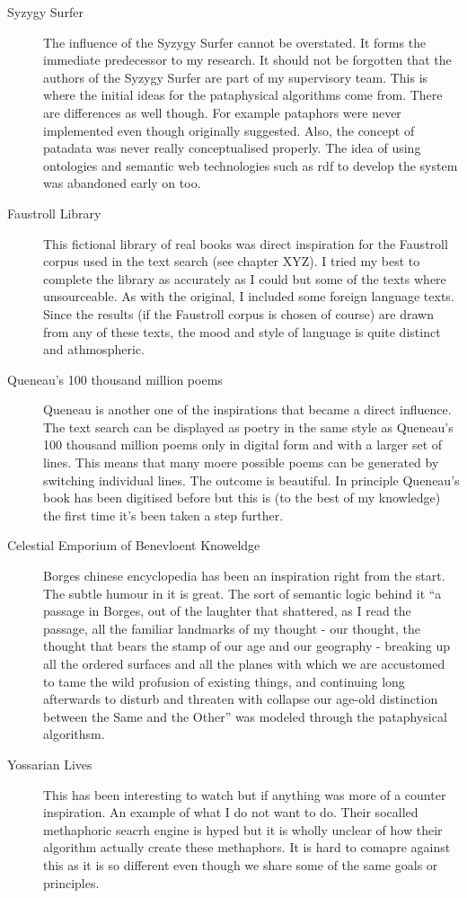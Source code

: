 \begin{description}
  \item[Syzygy Surfer] The influence of the Syzygy Surfer cannot be overstated. It forms the immediate predecessor to my research. It should not be forgotten that the authors of the Syzygy Surfer are part of my supervisory team. This is where the initial ideas for the pataphysical algorithms come from. There are differences as well though. For example pataphors were never implemented even though originally suggested. Also, the concept of patadata was never really conceptualised properly. The idea of using ontologies and semantic web technologies such as \gls{rdf} to develop the system was abandoned early on too.
  \item[Faustroll Library] This fictional library of real books was direct inspiration for the Faustroll corpus used in the text search (see chapter XYZ). I tried my best to complete the library as accurately as I could but some of the texts where unsourceable. As with the original, I included some foreign language texts. Since the results (if the Faustroll corpus is chosen of course) are drawn from any of these texts, the mood and style of language is quite distinct and athmospheric.
  \item[Queneau's 100 thousand million poems] Queneau is another one of the inspirations that became a direct influence. The text search can be displayed as poetry in the same style as Queneau's 100 thousand million poems only in digital form and with a larger set of lines. This means that many moere possible poems can be generated by switching individual lines. The outcome is beautiful. In principle Queneau's book has been digitised before but this is (to the best of my knowledge) the first time it's been taken a step further.
  \item[Celestial Emporium of Benevloent Knoweldge] Borges chinese encyclopedia has been an inspiration right from the start. The subtle humour in it is great. The sort of semantic logic behind it ``a passage in Borges, out of the laughter that shattered, as I read the passage, all the familiar landmarks of my thought - our thought, the thought that bears the stamp of our age and our geography - breaking up all the ordered surfaces and all the planes with which we are accustomed to tame the wild profusion of existing things, and continuing long afterwards to disturb and threaten with collapse our age-old distinction between the Same and the Other'' \autocite{Foucault1966} was modeled through the pataphysical algorithsm.
  \item[Yossarian Lives] This has been interesting to watch but if anything was more of a counter inspiration. An example of what I do not want to do. Their socalled methaphoric seacrh engine is hyped but it is wholly unclear of how their algorithm actually create these methaphors. It is hard to comapre against this as it is so different even though we share some of the same goals or principles.

\end{description}
